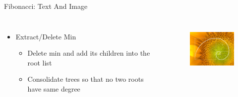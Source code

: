 \documentclass{beamer}
\begin{document}
\begin{frame}{Fibonacci: Text And Image}

\begin{columns}
    \begin{itemize}
        \item Extract/Delete Min
        \begin{itemize}
            \item \alert{Delete} min and \alert{add} its children into the root list
            \item {\color{gray}Consolidate trees so that no two roots have same degree}
        \end{itemize}
    \end{itemize}
    \pause
    \begin{figure}[h]
        \centering
        \includegraphics[width=3cm]{image.png}
        \label{fig:my_label}
    \end{figure}
    
\end{columns}
    
\end{frame}
\end{document}
